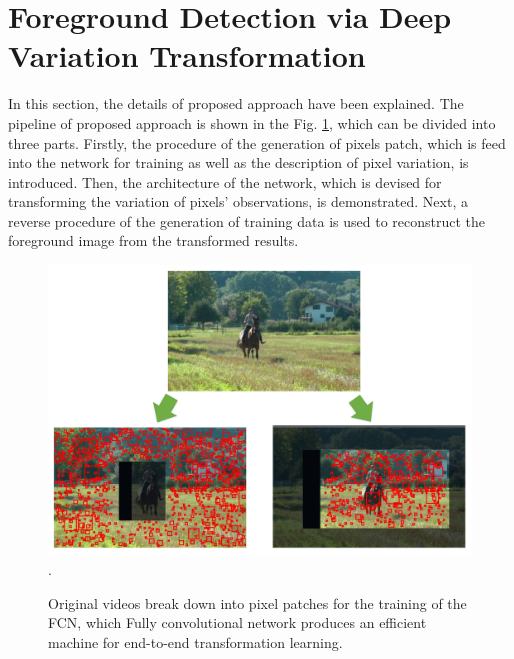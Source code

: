 \documentclass[journal]{IEEEtran}
\newcommand{\reffig}[1]{Fig. \ref{#1}}
\DeclareMathOperator*{\argmin}{argmin}
\begin{document}



\section{Foreground Detection via Deep Variation Transformation}
\label{sec4}
In this section, the details of proposed approach have been explained.
%
The pipeline of proposed approach is shown in the \reffig{flow_chart},
which can be divided into three parts.
%
Firstly, the procedure of the generation of pixels patch, 
which is feed into the network for training as well as the description of pixel variation,
is introduced.
%
Then,
the architecture of the network, which is devised for transforming the variation of pixels' observations, is demonstrated.
%
Next,
a reverse procedure of the generation of training data is used to reconstruct the foreground image from the transformed results.
%
%

\begin{figure}[!t] %
\centering
\includegraphics[width=\textwidth]{figure/fig2}
\DeclareGraphicsExtensions.
    \caption{ Original videos break down into pixel patches for the training of the FCN, which 
Fully convolutional network produces an efficient machine for end-to-end transformation learning.}
    \label{flow_chart}
\end{figure}
\end{document}
